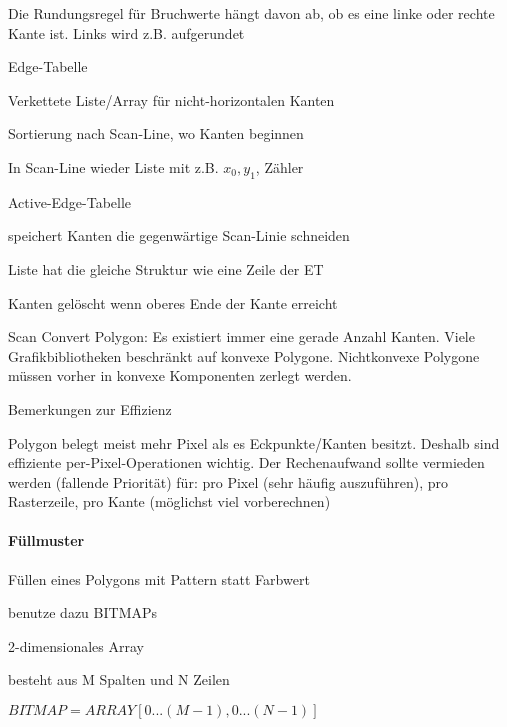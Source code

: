 \documentclass[landscape]{article}
\begin{document}
\begin{multicols}{3}
\begin{itemize*}
\begin{itemize*}
      \item Die Rundungsregel für Bruchwerte hängt davon ab, ob es eine linke oder rechte Kante ist. Links wird z.B. aufgerundet
    \end{itemize*}
    \item Edge-Tabelle
    \begin{itemize*}
      \item Verkettete Liste/Array für nicht-horizontalen Kanten
      \item Sortierung nach Scan-Line, wo Kanten beginnen
      \item In Scan-Line wieder Liste mit z.B. $x_0, y_1$, Zähler
    \end{itemize*}
    \item Active-Edge-Tabelle
    \begin{itemize*}
      \item speichert Kanten die gegenwärtige Scan-Linie schneiden
      \item Liste hat die gleiche Struktur wie eine Zeile der ET
      \item Kanten gelöscht wenn oberes Ende der Kante erreicht
    \end{itemize*}
    \item Scan Convert Polygon: Es existiert immer eine gerade Anzahl Kanten. Viele Grafikbibliotheken beschränkt auf konvexe Polygone. Nichtkonvexe Polygone müssen vorher in konvexe Komponenten zerlegt werden.
    \item Bemerkungen zur Effizienz
    \begin{itemize*}
      \item Polygon belegt meist mehr Pixel als es Eckpunkte/Kanten besitzt. Deshalb sind effiziente per-Pixel-Operationen wichtig. Der Rechenaufwand sollte vermieden werden (fallende Priorität) für: pro Pixel (sehr häufig auszuführen), pro Rasterzeile, pro Kante (möglichst viel vorberechnen)
    \end{itemize*}
  \end{itemize*}
  
  \paragraph{Füllmuster}
  \begin{itemize*}
    \item Füllen eines Polygons mit Pattern statt Farbwert
    \item benutze dazu BITMAPs
    \item 2-dimensionales Array
    \item besteht aus M Spalten und N Zeilen
    \item $BITMAP = ARRAY [0... (M-1), 0...(N-1)]$
  \end{itemize*}
  

\end{multicols}
\end{document}
